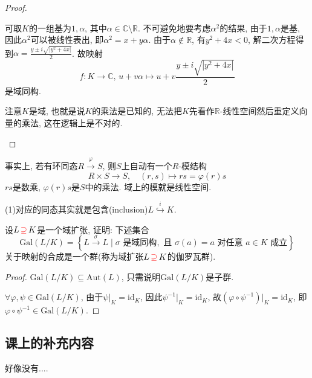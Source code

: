 \documentclass{../solutions-cn}
\begin{document}
\begin{proof}
\begin{enumerate}[(1)]
        可取$K$的一组基为$1, \alpha$, 其中$\alpha \in \mathbb{C} \setminus \mathbb{R}$. 不可避免地要考虑$\alpha^2$的结果, 由于$1, \alpha$是基, 因此$\alpha^2$可以被线性表出, 即$\alpha^2 = x + y\alpha$. 由于$\alpha \notin \mathbb{R}$, 有$y^2 + 4x < 0$, 解二次方程得到$\alpha = \frac{y \pm i\sqrt{|y^2 + 4x|}}{2}$. 故映射
        \[
            f: K \to \mathbb{C},\, u + v\alpha \mapsto u + v\frac{y \pm i\sqrt{|y^2 + 4x|}}{2}
        \]
        是域同构.
        
        注意$K$是域, 也就是说$K$的乘法是已知的, 无法把$K$先看作$\mathbb{R}$-线性空间然后重定义向量的乘法, 这在逻辑上是不对的.
    \end{enumerate}
\end{proof}

\begin{remark}
    事实上, 若有环同态$R \overset{\varphi}\to S$, 则$S$上自动有一个$R$-模结构
    \[
        R \times S \to S, \quad (r, s) \mapsto rs = \varphi(r)s
    \]
    $rs$是数乘, $\varphi(r)s$是$S$中的乘法. 域上的模就是线性空间.
    
    (1)对应的同态其实就是包含(inclusion)$L \overset{i}\hookrightarrow K$.
\end{remark}

\begin{exercise}[习题1.4.11]
    设$L \,\textcolor{red}{\supseteq}\, K$是一个域扩张, 证明: 下述集合
    \[
        \mathrm{Gal}(L/K) = \left\{L \xrightarrow{\sigma} L \mid \sigma\text{ 是域同构},\text{ 且 } \sigma(a) = a \text{ 对任意 } a \in K \text{ 成立}\right\}
    \]
    关于映射的合成是一个群(称为域扩张$L \,\textcolor{red}{\supseteq}\, K$的伽罗瓦群).
\end{exercise}

\begin{proof}
    $\mathrm{Gal}(L/K) \subseteq \mathrm{Aut}(L)$, 只需说明$\mathrm{Gal}(L/K)$是子群.

    $\forall \varphi, \psi \in \mathrm{Gal}(L/K)$, 由于$\psi|_K = \mathrm{id}_K$, 因此$\psi^{-1}|_K = \mathrm{id}_K$, 故$(\varphi \circ \psi^{-1})|_K = \mathrm{id}_K$, 即$\varphi \circ \psi^{-1} \in \mathrm{Gal}(L/K)$.
\end{proof}

\subsection*{课上的补充内容}
好像没有....
\end{document}
